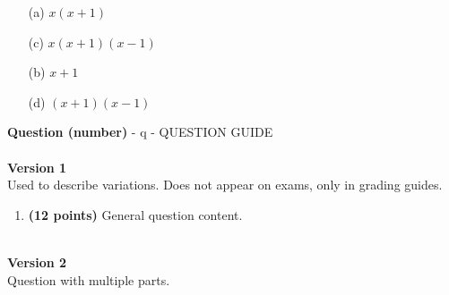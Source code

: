 \documentclass[12pt]{amsart}
\begin{document}
\begin{enumerate}[resume]
\begin{minipage}[t]{1.0\linewidth}\begin{multicols}{2}\begin{itemize}\item[(a)]  $x(x+1)$ \item[(c)]  $x(x+1)(x-1)$ \item[(b)]  $x+1$ \item[(d)]  $(x+1)(x-1)$ \end{itemize}\end{multicols}\end{minipage} \vfill \end{enumerate}\newpage\newpage\def \a{7}\def \atwoone{2}\def \atwotwo{-6}\def \atwothree{4}\def \btwothree{6}\def \sumtwothree{10}\def \diftwothree{-2}\def \bigtwothree{400}\def \powtwothree{1296}\def \logtwothree{0.7737056144690831}\def \factortwothree{65}\def \atwofour{1.02}\def \btwofour{1.5}\def \tooshorttwofour{10.1}\def \moneytwofour{10.10}\def \longertwofour{10.10000}\def \atwofive{0.12}\def \btwofive{0.12346}\def \athreeone{6}\def \bthreeone{5}\def \setthreetwo{[3, 7, 7]}\def \athreetwo{3}\def \bthreetwo{7}\def \cthreetwo{7}\def \controlthreethree{-8}\def \athreethree{4}\def \topthreethree{0}\def \athreefour{5}\def \bthreefour{4}\def \listthreefour{[1, 2, 3, 4]}\def \afourone{12}\def \bfourone{-8}\def \fracfourone{\frac{-3}{2}}\def \rootfourtwo{8}\def \simplifiedfourtwo{2 \sqrt{2}}\def \sqrtlistfourtwo{[2, 2]}\def \outfourtwo{2}\def \infourtwo{2}\def \wowfourtwo{1}\def \afourthree{5}\def \nicethreefour{3x^{2}-x^{}+5}\def \nastythreefour{xyz^{3}+5}\def \cfourthree{-4}\def \dfourthree{9}\def \infourthree{-4x^{}}\def \outfourthree{+9y^{}}\def \afourfour{1298054}\def \nicefourfour{1,298,054}\def \goodfourfour{1,000,000.12345}\def \badfourfour{1,000,000.1}{\Large{\bf Question (number)}} - q - QUESTION GUIDE\\ $ $ \\ {\bf Version 1} \\
Used to describe variations. Does not appear on exams, only in grading guides.
\begin{enumerate}[resume]
\item {\bf (12 points)} 
 General question content.

\vfill 
 \end{enumerate}$ $ \\ {\bf Version 2} \\ 
Question with multiple parts.
\end{document}
